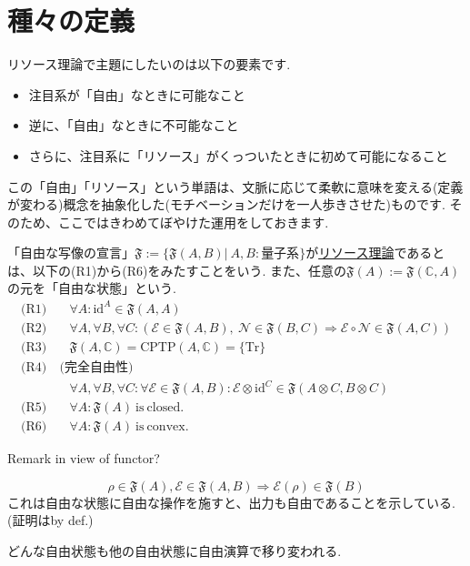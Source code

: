 \documentclass[uplatex, a4paper]{jsarticle}
\begin{document}
\section{種々の定義}
\begin{mtvn}
  リソース理論で主題にしたいのは以下の要素です.
  \begin{itemize}
    \item 注目系が「自由」なときに可能なこと
    \item 逆に、「自由」なときに不可能なこと
    \item さらに、注目系に「リソース」がくっついたときに初めて可能になること
  \end{itemize}
  この「自由」「リソース」という単語は、文脈に応じて柔軟に意味を変える(定義が変わる)概念を抽象化した(モチベーションだけを一人歩きさせた)ものです.
  そのため、ここではきわめてぼやけた運用をしておきます.
\end{mtvn}
\begin{defn}
  「自由な写像の宣言」$\mathfrak{F} := \{ \mathfrak{F}(A,B)| \:A,B:\text{量子系} \}$が\underline{リソース理論}であるとは、以下の(R1)から(R6)をみたすことをいう. 
  また、任意の$\mathfrak{F}(A) := \mathfrak{F}(\mathbb{C}, A)$の元を「自由な状態」という.
  \begin{align*}
    \textrm{(R1)}& \quad \forall A: \mathrm{id}^A \in \mathfrak{F}(A, A) \\
    \textrm{(R2)}& \quad \forall A, \forall B, \forall C: \left( \mathscr{E} \in \mathfrak{F}(A, B), \:\mathscr{N} \in \mathfrak{F}(B, C) 
                  \Rightarrow \mathscr{E} \circ \mathscr{N} \in \mathfrak{F}(A, C) \right) \\
    \textrm{(R3)}& \quad \mathfrak{F}(A, \mathbb{C}) = \mathrm{CPTP}(A, \mathbb{C}) = \{ \mathrm{Tr} \} \\
    \textrm{(R4)}& \: \textrm{(完全自由性)} \\
                &\quad \forall A, \forall B, \forall C: \forall \mathscr{E} \in \mathfrak{F}(A,B): 
                  \mathscr{E}\otimes \mathrm{id}^C \in \mathfrak{F}(A\otimes C, B\otimes C) \\
    \textrm{(R5)}& \quad \forall A: \mathfrak{F}(A) \: \mathrm{is \: closed.} \\
    \textrm{(R6)}& \quad \forall A: \mathfrak{F}(A) \: \mathrm{is \: convex.}
  \end{align*}
\end{defn}
Remark in view of functor?
\begin{prop}["黄金律"]
  \[ \rho \in \mathfrak{F}(A), \mathscr{E} \in \mathfrak{F}(A, B) 
  \Rightarrow \mathscr{E}(\rho) \in \mathfrak{F}(B) \]
  これは自由な状態に自由な操作を施すと、出力も自由であることを示している.(証明はby def.)
\end{prop}
\begin{rmk}
  どんな自由状態も他の自由状態に自由演算で移り変われる.
\end{rmk}
\end{document}
